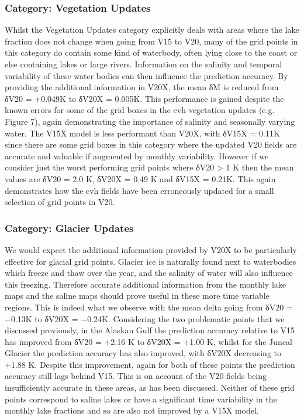 \documentclass[hess, manuscript]{copernicus}
\begin{document}
\subsubsection{Category: Vegetation Updates}
Whilst the Vegetation Updates category explicitly deals with areas where the lake fraction does not change when going from V15 to V20, many of the grid points in this category do contain some kind of waterbody, often lying close to the coast or else containing lakes or large rivers. Information on the salinity and temporal variability of these water bodies can then influence the prediction accuracy. By providing the additional information in V20X, the mean δM is reduced from δV20 = +0.049K to δV20X = 0.005K. This performance is gained despite the known errors for some of the grid boxes in the cvh vegetation updates (e.g. Figure 7), again demonstrating the importance of salinity and seasonally varying water. The V15X model is less performant than V20X, with δV15X = 0.11K since there are some grid boxes in this category where the updated V20 fields are accurate and valuable if augmented by monthly variability. However if we consider just the worst performing grid points where δV20 > 1 K then the mean values are δV20 = 2.0 K, δV20X = 0.49 K and δV15X = 0.21K. This again demonstrates how the cvh fields have been erroneously updated for a small selection of grid points in V20.



\subsubsection{Category: Glacier Updates}
We would expect the additional information provided by V20X to be particularly effective for glacial grid points. Glacier ice is naturally found next to waterbodies which freeze and thaw over the year, and the salinity of water will also influence this freezing. Therefore accurate additional information from the monthly lake maps and the saline maps should prove useful in these more time variable regions. This is indeed what we observe with the mean delta going from δV20 = −0.13K to δV20X = −0.24K. Considering the two problematic points that we discussed previously, in the Alaskan Gulf the prediction accuracy relative to V15 has improved from δV20 = +2.16 K to δV20X = +1.00 K, whilst for the Juncal Glacier the prediction accuracy has also improved, with δV20X decreasing to +1.88 K. Despite this improvement, again for both of these points the prediction accuracy still lags behind V15. This is on account of the V20 fields being insufficiently accurate in these areas, as has been discussed. Neither of these grid points correspond to saline lakes or have a significant time variability in the monthly lake fractions and so are also not improved by a V15X model.
\end{document}
